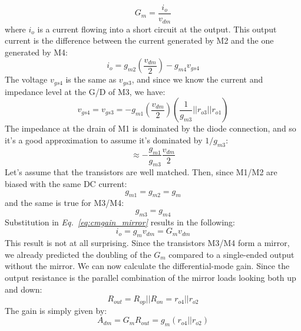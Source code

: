     \begin{equation}
        {G_m} = \frac{{{i_o}}}{{{v_{dm}}}}
    \end{equation}
where $i_o$ is a current flowing into a short circuit at the output.  This output current is the difference between the current generated by M2 and the one generated by M4:
    \begin{equation}
        {i_o} = {g_{m2}}\left( {\frac{{{v_{dm}}}}{2}} \right) - {g_{m4}}{v_{gs4}}
        \label{eq:cmgain_mirror}
    \end{equation}
The voltage $v_{gs4}$ is the same as $v_{gs3}$, and since we know the current and impedance level at the G/D of M3, we have:
    \begin{equation}
        {v_{gs4}} = {v_{gs3}} =  - {g_{m1}}\left( {\frac{{{v_{dm}}}}{2}} \right)\left( {\frac{1}{{{g_{m3}}}}||{r_{o3}}||{r_{o1}}} \right) 
    \end{equation}
The impedance at the drain of M1 is dominated by the diode connection, and so it's a good approximation to assume it's dominated by $1/g_{m3}$:
    \begin{equation}
        \approx  - \frac{{{g_{m1}}}}{{{g_{m3}}}}\frac{{{v_{dm}}}}{2}
    \end{equation}
Let's assume that the transistors are well matched.  Then, since M1/M2 are biased with the same DC current:
    \begin{equation}
        {g_{m1}} = {g_{m2}} = {g_m}
    \end{equation}
and the same is true for M3/M4:
    \begin{equation}
        {g_{m3}} = {g_{m4}}
    \end{equation}
Substitution in \emph{Eq.~\ref{eq:cmgain_mirror}} results in the following:
    \begin{equation}
        {i_o} = {g_m}{v_{dm}} = G_m v_{dm}
    \end{equation}
This result is not at all surprising.  Since the transistors M3/M4 form a mirror, we already predicted the doubling of the $G_m$ compared to a single-ended output without the mirror.
We can now calculate the differential-mode gain.  Since the output resistance is the parallel combination of the mirror loads looking both up and down:
    \begin{equation}
        {R_{out}} = {R_{op}}||{R_{on}} = {r_{o4}}||{r_{o2}}
    \end{equation}
The gain is simply given by:
    \begin{equation}
        {A_{dm}} = {G_m}{R_{out}} = {g_m}\left( {{r_{o4}}||{r_{o2}}} \right)
    \end{equation}
